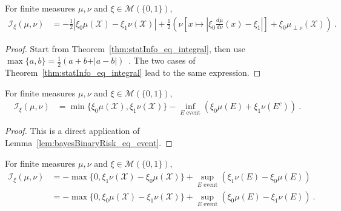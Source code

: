 \begin{corollary}
  \label{cor:statInfo_eq_integral_abs}
  \leanok
  For finite measures $\mu, \nu$ and $\xi \in \mathcal M(\{0,1\})$,
  \begin{align*}
  \mathcal I_\xi(\mu, \nu)
  &= -\frac{1}{2} \left\vert\xi_0 \mu(\mathcal X) - \xi_1 \nu(\mathcal X)\right\vert + \frac{1}{2}\left( \nu\left[ x \mapsto \left\vert\xi_0\frac{d \mu}{d\nu}(x) - \xi_1 \right\vert \right]  + \xi_0 \mu_{\perp \nu}(\mathcal X)\right)
  \: .
  \end{align*}
\end{corollary}

\begin{proof}\leanok
{}
Start from Theorem~\ref{thm:statInfo_eq_integral}, then use $\max\{a,b\} = \frac{1}{2}\left( a + b + \vert a - b \vert \right)$~.
The two cases of Theorem~\ref{thm:statInfo_eq_integral} lead to the same expression.
\end{proof}


\begin{lemma}
  \label{lem:statInfo_eq_sub_inf_event}
  \leanok
  For finite measures $\mu, \nu$ and $\xi \in \mathcal M(\{0,1\})$,
  \begin{align*}
  \mathcal I_\xi(\mu, \nu)
  &= \min\{\xi_0 \mu(\mathcal X), \xi_1 \nu(\mathcal X)\} - \inf_{E \text{ event}} \left( \xi_0 \mu(E) + \xi_1 \nu(E^c) \right)
  \: .
  \end{align*}
\end{lemma}

\begin{proof}\leanok
{}
This is a direct application of Lemma~\ref{lem:bayesBinaryRisk_eq_event}.
\end{proof}


\begin{lemma}
  \label{lem:statInfo_eq_sup_event}
  For finite measures $\mu, \nu$ and $\xi \in \mathcal M(\{0,1\})$,
  \begin{align*}
  \mathcal I_\xi(\mu, \nu)
  &= - \max\{0, \xi_1 \nu(\mathcal X) - \xi_0 \mu(\mathcal X) \} + \sup_{E \text{ event}} \left( \xi_1 \nu(E) - \xi_0 \mu(E) \right)
  \\
  &= - \max\{0, \xi_0 \mu(\mathcal X) - \xi_1 \nu(\mathcal X) \} + \sup_{E \text{ event}} \left( \xi_0 \mu(E) - \xi_1 \nu(E) \right)
  \: .
  \end{align*}
\end{lemma}

